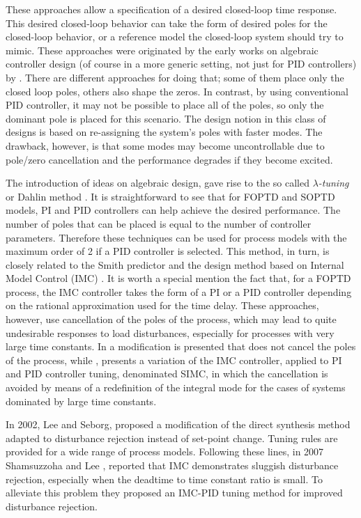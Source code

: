 These approaches allow a specification of a desired closed-loop time response. This desired closed-loop behavior can take the form of desired poles for the closed-loop behavior, or a reference model the closed-loop system should try to mimic.  These approaches were originated by the early works on algebraic controller design (of course in a more generic setting, not just for PID controllers) by \cite{ragazzini1958}. There are different approaches for doing that; some of them place only the closed loop poles, others also shape the zeros. In contrast, by using conventional PID controller, it may not be possible to place all of the poles, so only the dominant pole is placed for this scenario. The design notion in this class of designs is based on re-assigning the system's poles with faster modes. The drawback, however, is that some modes may become uncontrollable due to pole/zero cancellation and the performance degrades if they become excited.


The introduction of ideas on algebraic design, gave rise to the so called \emph{$\lambda$-tuning} or  Dahlin method \cite{dahlin68}. It is straightforward to see that for FOPTD and  SOPTD models, PI and PID
controllers can help achieve the desired performance. The number of poles that can be placed is equal to the number of controller parameters. Therefore these techniques can be used for process models with the maximum order of 2 if a PID controller is selected. This method, in turn, is closely related to the Smith predictor and the design method based on Internal Model Control (IMC) \cite{riveraetall86}.  It is worth a special mention the fact that, for a FOPTD process, the IMC controller takes the form of a PI or a PID controller depending on the rational approximation used for the time delay.  These approaches, however, use cancellation of the poles of the process, which may lead to quite undesirable responses to load disturbances, especially for processes with very large time constants. In \cite{chien90} a modification is presented  that does not cancel the poles of the process, while \cite{Skogestad2003}, presents a variation of the IMC controller, applied to PI and PID controller tuning, denominated SIMC, in which the cancellation is avoided by means of a redefinition of the integral mode for the cases of systems dominated by large time constants. 

In 2002,  Lee and Seborg,\cite{chenseborg2002} proposed a modification of the direct synthesis method adapted to disturbance rejection instead of set-point change. Tuning rules are provided for a wide range of process models. Following these lines, in 2007  Shamsuzzoha and Lee \cite{shamsu2008}, reported that IMC demonstrates sluggish disturbance rejection, especially when the deadtime to time constant ratio is small. To alleviate this problem they proposed an IMC-PID tuning method for improved disturbance rejection.

